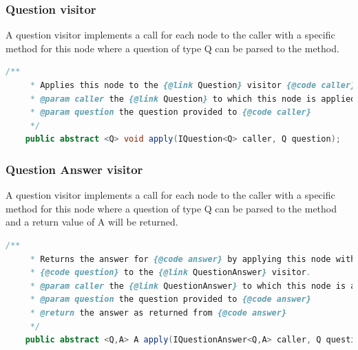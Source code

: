 \documentclass{overturerep}
\begin{document}
\subsubsection{Question visitor}
A question visitor implements a call for each node to the caller with a specific method for this node where a question of type Q can be parsed to the method.
\begin{lstlisting}[language=java]
	/**
	 * Applies this node to the {@link Question} visitor {@code caller}.
	 * @param caller the {@link Question} to which this node is applied
	 * @param question the question provided to {@code caller}
	 */
	public abstract <Q> void apply(IQuestion<Q> caller, Q question);
\end{lstlisting}

\subsubsection{Question Answer visitor}
A question visitor implements a call for each node to the caller with a specific method for this node where a question of type Q can be parsed to the method and a return value of A will be returned.
\begin{lstlisting}[language=java]
	/**
	 * Returns the answer for {@code answer} by applying this node with the
	 * {@code question} to the {@link QuestionAnswer} visitor.
	 * @param caller the {@link QuestionAnswer} to which this node is applied
	 * @param question the question provided to {@code answer}
	 * @return the answer as returned from {@code answer}
	 */
	public abstract <Q,A> A apply(IQuestionAnswer<Q,A> caller, Q question);
\end{lstlisting}




\end{document}
